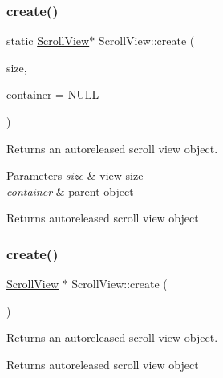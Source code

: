 \subsubsection{\texorpdfstring{create()}{create()}\hspace{0.1cm}{\footnotesize\ttfamily [2/4]}}
{\footnotesize\ttfamily static \hyperlink{classScrollView}{Scroll\+View}$\ast$ Scroll\+View\+::create (\begin{DoxyParamCaption}\item[{\hyperlink{classSize}{Size}}]{size,  }\item[{\hyperlink{classNode}{Node} $\ast$}]{container = {\ttfamily NULL} }\end{DoxyParamCaption})\hspace{0.3cm}{\ttfamily [static]}}

Returns an autoreleased scroll view object.


\begin{DoxyParams}{Parameters}
{\em size} & view size \\
\hline
{\em container} & parent object \\
\hline
\end{DoxyParams}
\begin{DoxyReturn}{Returns}
autoreleased scroll view object 
\end{DoxyReturn}
\mbox{\label{classScrollView_a67c16969c9f515d00488fb58dd8318a3}} 
\subsubsection{\texorpdfstring{create()}{create()}\hspace{0.1cm}{\footnotesize\ttfamily [3/4]}}
{\footnotesize\ttfamily \hyperlink{classScrollView}{Scroll\+View} $\ast$ Scroll\+View\+::create (\begin{DoxyParamCaption}\item[{void}]{ }\end{DoxyParamCaption})\hspace{0.3cm}{\ttfamily [static]}}

Returns an autoreleased scroll view object.

\begin{DoxyReturn}{Returns}
autoreleased scroll view object 
\end{DoxyReturn}
\mbox{\label{classScrollView_ab688cda5af4913f7299b627ddb0eb6cb}} 
